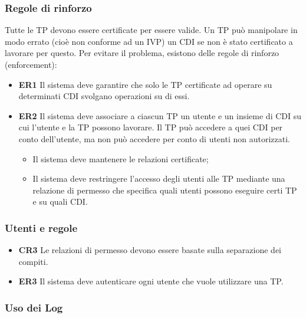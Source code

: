 \subsubsection{Regole di rinforzo}

Tutte le TP devono essere certificate per essere valide.
Un TP può manipolare in modo errato (cioè non conforme ad un IVP) un CDI se 
non è stato
certificato a lavorare per questo. Per evitare il problema, esistono delle 
regole di rinforzo
(enforcement):

\begin{itemize}
      \item \textbf{ER1} Il sistema deve garantire che solo le TP certificate ad
            operare su determinati CDI svolgano
            operazioni su di essi.
      \item \textbf{ER2} Il sistema deve associare a ciascun TP un utente e un
            insieme di CDI su cui l'utente e la TP possono lavorare. Il TP può 
            accedere a quei CDI per conto dell’utente, ma non può accedere per conto di 
            utenti non autorizzati.
            \begin{itemize}
                  \item Il sistema deve mantenere le relazioni certificate;
                  \item Il sistema deve restringere l’accesso degli utenti alle
                        TP mediante una relazione di
                        permesso che specifica quali utenti possono eseguire 
                        certi TP e su quali CDI.
            \end{itemize}
\end{itemize}

\subsubsection{Utenti e regole}

\begin{itemize}
      \item \textbf{CR3} Le relazioni di permesso devono essere basate sulla
            separazione dei compiti.
      \item \textbf{ER3} Il sistema deve autenticare ogni utente che vuole
            utilizzare una TP.
\end{itemize}

\subsubsection{Uso dei Log}

